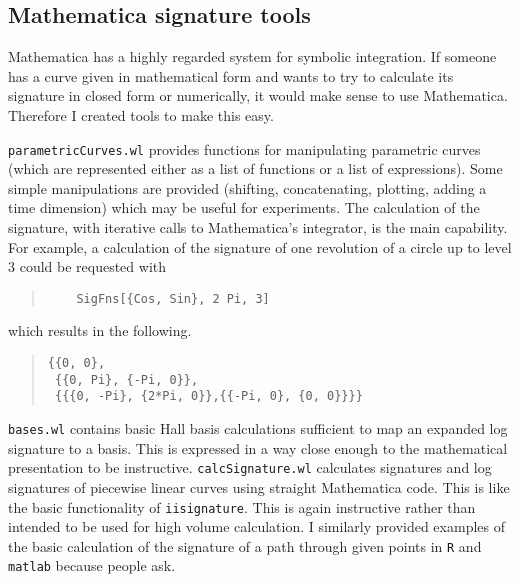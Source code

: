 \subsection{Mathematica signature tools}
Mathematica has a highly regarded system for symbolic integration. If someone has a curve given in mathematical form and wants to try to calculate its signature in closed form or numerically, it would make sense to use Mathematica. Therefore I created tools to make this easy.

\verb|parametricCurves.wl| provides functions for manipulating parametric curves (which are represented either as a list of functions or a list of expressions). Some simple manipulations are provided (shifting, concatenating, plotting, adding a time dimension) which may be useful for experiments. The calculation of the signature, with iterative calls to Mathematica's integrator, is the main capability.
For example, a calculation of the signature of one revolution of a circle up to level 3 could be requested with
\begin{quotation}
	\begin{lstlisting}
	SigFns[{Cos, Sin}, 2 Pi, 3]
	\end{lstlisting}
\end{quotation}
which results in the following.
\begin{quotation}
	\begin{lstlisting}
{{0, 0}, 
 {{0, Pi}, {-Pi, 0}}, 
 {{{0, -Pi}, {2*Pi, 0}},{{-Pi, 0}, {0, 0}}}}
	\end{lstlisting}
\end{quotation}

\verb|bases.wl| contains basic Hall basis calculations sufficient to map an expanded log signature to a basis. This is expressed in a way close enough to the mathematical presentation to be instructive.
\verb|calcSignature.wl| calculates signatures and log signatures of piecewise linear curves using straight Mathematica code. 
This is like the basic functionality of \verb|iisignature|. This is again instructive rather than intended to be used for high volume calculation.
I similarly provided examples of the basic calculation of the signature of a path through given points in \texttt{R} and \texttt{matlab} because people ask.



